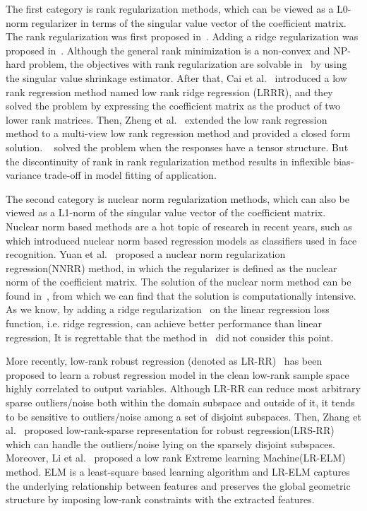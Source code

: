 \documentclass{ieeeaccess}
\begin{document}
The first category is rank regularization methods, which can be viewed as a L0-norm regularizer in terms of the singular value vector of the coefficient matrix. The rank regularization was first proposed in~\cite{ref27}. Adding a ridge regularization was proposed in~\cite{ref26}. Although the general rank minimization is a non-convex and NP-hard problem, the objectives with rank regularization are solvable in~\cite{ref07} by using the singular value shrinkage estimator. After that, Cai et al.~\cite{ref11} introduced a low rank regression method named low rank ridge regression (LRRR), and they solved the problem by expressing the coefficient matrix as the product of two lower rank matrices. Then, Zheng et al.~\cite{ref12} extended the low rank regression method to a multi-view low rank regression method and provided a closed form solution. ~\cite{ref28} solved the problem when the responses have a tensor structure. But the discontinuity of rank in rank regularization method results in inflexible bias-variance trade-off in model fitting of application.

The second category is nuclear norm regularization methods, which can also be viewed as a L1-norm of the singular value vector of the coefficient matrix. Nuclear norm based methods are a hot topic of research in recent years, such as~\cite{ref28,ref29} which introduced nuclear norm based regression models as classifiers used in face recognition. Yuan et al.~\cite{ref02} proposed a nuclear norm regularization regression(NNRR) method, in which the regularizer is defined as the nuclear norm of the coefficient matrix. The solution of the nuclear norm method can be found in~\cite{ref03,ref14}, from which we can find that the solution is computationally intensive. As we know, by adding a ridge regularization~\cite{ref04} on the linear regression loss function, i.e. ridge regression, can achieve better performance than linear regression, It is regrettable that the method in~\cite{ref02} did not consider this point.

More recently, low-rank robust regression (denoted as LR-RR)~\cite{ref33} has been proposed to learn a robust regression model in the clean low-rank sample space highly correlated to output variables. Although LR-RR can reduce most arbitrary sparse outliers/noise both within the domain subspace and outside of it, it tends to be sensitive to outliers/noise among a set of disjoint subspaces. Then, Zhang et al.~\cite{ref32} proposed low-rank-sparse representation for robust regression(LRS-RR) which can handle the outliers/noise lying on the sparsely disjoint subspaces. Moreover, Li et al.~\cite{ref34} proposed a low rank Extreme learning Machine(LR-ELM) method. ELM is a least-square based learning algorithm and LR-ELM captures the underlying relationship between features and preserves the global geometric structure by imposing low-rank constraints with the extracted features.
\end{document}

